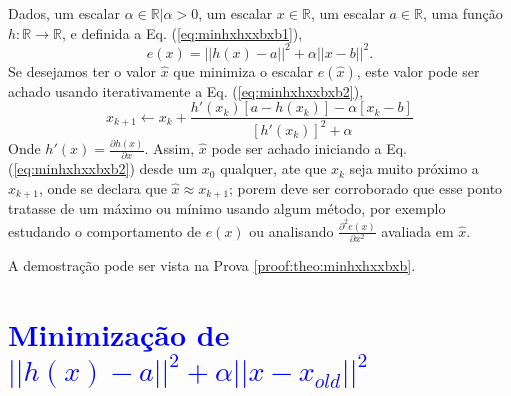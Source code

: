 \begin{theorem}\label{theo:minhxhxxbxb}
Dados,
um escalar $\alpha \in \mathbb{R} | \alpha > 0$, 
um escalar $x \in \mathbb{R}$, 
um escalar $a \in \mathbb{R}$,  
uma função $h:\mathbb{R} \rightarrow \mathbb{R}$, e 
definida a Eq. (\ref{eq:minhxhxxbxb1}),
\begin{equation}\label{eq:minhxhxxbxb1}
e(x)=||h(x)-a||^2+\alpha ||x-b||^2.
\end{equation}
Se desejamos ter o valor $\hat{x}$ que minimiza o escalar $e(\hat{x})$,
este valor pode ser achado usando iterativamente a Eq. (\ref{eq:minhxhxxbxb2}),
\begin{equation}\label{eq:minhxhxxbxb2}
x_{k+1} \leftarrow x_k+
\frac{ h'(x_k) \left[a-h(x_k)\right]-\alpha\left[ x_k-b\right]}{\left[h'(x_k)\right]^2+\alpha}
\end{equation}
Onde  $h'(x)=\frac{\partial h(x)}{\partial x}$.
Assim, $\hat{x}$ pode ser achado iniciando a Eq. (\ref{eq:minhxhxxbxb2}) desde um $x_{0}$ qualquer, ate que $x_{k}$ seja muito próximo a $x_{k+1}$,
onde se declara que $\hat{x} \approx x_{k+1}$; porem deve ser corroborado
que esse ponto tratasse de um máximo ou mínimo usando algum método, por exemplo estudando o comportamento 
de $e(x)$ ou analisando  $\frac{\partial^2 e(x)}{\partial x^2}$ avaliada em $\hat{x}$.

\FALTAPROVA
A demostração pode ser vista na Prova \ref{proof:theo:minhxhxxbxb}.
\end{theorem}

\section{\textcolor{blue}{Minimização de $||h(x)-a||^2+\alpha ||x-x_{old}||^2$}}

